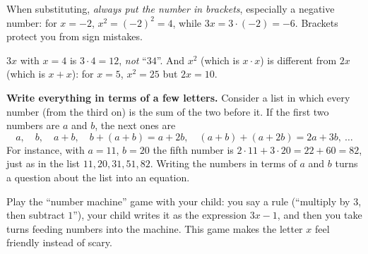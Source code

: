 \documentclass[11pt]{article}
\newenvironment{figC}{\par\vspace{2pt}\begin{center}\begin{tikzpicture}[font=\sffamily\small,>=stealth,line join=round]}%
  {\end{tikzpicture}\end{center}\vspace{1pt}}
\begin{document}

\begin{tipbox}
When substituting, \emph{always put the number in brackets}, especially a negative number: for $x=-2$,
$x^2=(-2)^2=4$, while $3x=3\cdot(-2)=-6$. Brackets protect you from sign mistakes.
\end{tipbox}

\begin{warnbox}
$3x$ with $x=4$ is $3\cdot 4=12$, \emph{not} ``$34$''. And $x^2$ (which is $x\cdot x$) is different from $2x$ (which is $x+x$):
for $x=5$, $x^2=25$ but $2x=10$.
\end{warnbox}

\begin{tipbox}
\textbf{Write everything in terms of a few letters.} Consider a list in which every number (from the third on) is the sum of the two before it.
If the first two numbers are $a$ and $b$, the next ones are
\[a,\quad b,\quad a+b,\quad b+(a+b)=a+2b,\quad (a+b)+(a+2b)=2a+3b,\ \dots\]
For instance, with $a=11$, $b=20$ the fifth number is $2\cdot 11+3\cdot 20=22+60=82$, just as in the list $11,20,31,51,82$.
Writing the numbers in terms of $a$ and $b$ turns a question about the list into an equation.
\end{tipbox}

\begin{parentbox}
Play the ``number machine'' game with your child: you say a rule (``multiply by $3$, then subtract $1$''),
your child writes it as the expression $3x-1$, and then you take turns feeding numbers into the machine. This game makes
the letter $x$ feel friendly instead of scary.
\end{parentbox}
\end{document}
